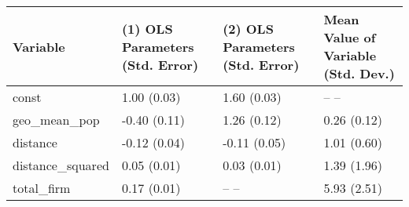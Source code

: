\begin{tabular}{llll}
\hline
 Variable         & (1) OLS
Parameters
(Std. Error)   & (2) OLS
Parameters
(Std. Error)   & Mean Value
of Variable
(Std. Dev.)   \\
\hline
 const            & 1.00
(0.03)                       & 1.60
(0.03)                       & --
--                                \\
 geo\_mean\_pop     & -0.40
(0.11)                      & 1.26
(0.12)                       & 0.26
(0.12)                          \\
 distance         & -0.12
(0.04)                      & -0.11
(0.05)                      & 1.01
(0.60)                          \\
 distance\_squared & 0.05
(0.01)                       & 0.03
(0.01)                       & 1.39
(1.96)                          \\
 total\_firm       & 0.17
(0.01)                       & --
--                             & 5.93
(2.51)                          \\
\hline
\end{tabular}